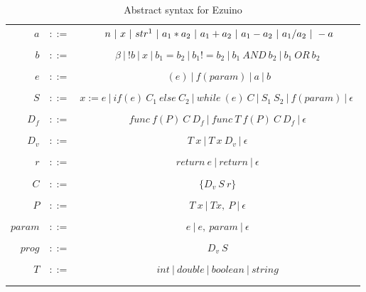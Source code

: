 \begin{longtable}[c] { r c c }
  \label{abstract-syntax}
  \centering
  
  \(a\) & \(::=\) & \(\ n\ |\ x\ |\ str\footnote{strings can only be used for concatination}\ |\ a_1*a_2\ |\ a_1 + a_2\ |\ a_1 - a_2\ |\ a_1 / a_2\ |\ -a \) \\
    &  & \\
  
  \(b\) & \(::=\) & \(\ \beta \ |\ !b\ |\ x\ |\ b_1 = b_2\ |\ b_1 != b_2\ |\ b_1\ AND\ b_2\ |\ b_1\ OR\ b_2\ \) \\
    &  & \\
  
  \(e\) & \(::=\) & \(\ (e)\ |\ f(param)\ |\ a\ |\ b\) \\
    &  & \\

  \(S\) & \(::=\) & \(x := e\ |\ if(e)\ C_1\ else\ C_2\ |\ while\ (e)\ C\ |\ S_1\ S_2\ |\ f(param)\ |\ \epsilon\ \) \\
    &  & \\

  \(D_f\) & \(::=\) & \(func\ f(P)\ C\ D_f\ |\ func\ T\ f(P)\ C\ D_f\ |\ \epsilon \) \\
    &  & \\

  \(D_v\) & \(::=\) & \( T\ x\ |\ T\ x\ D_v\ |\ \epsilon \) \\
    &  & \\

  \(r\) & \(::=\) & \( return\ e\ |\ return\ |\ \epsilon \) \\
    &  & \\

  \(C\) & \(::=\) & \( \{ D_v\ S\ r\} \) \\
    &  & \\

  \(P\) & \(::=\) & \( T\ x\ |\ T x,\ P\ |\ \epsilon \) \\
    &  & \\

  \(param\) & \(::=\) & \( e\ |\ e,\ param\ |\ \epsilon \) \\
    &  & \\

  \(prog\) & \(::=\) & \( D_v\ S \) \\
    &  & \\

  \(T\) & \(::=\) & \( int\ |\ double\ |\ boolean\ |\ string \) \\
    &  & \\

  \caption{Abstract syntax for Ezuino}
\end{longtable}


